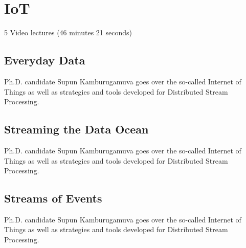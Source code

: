 


\chapter{IoT}
\label{sec:icloud-iot}

\FILENAME

  5 Video lectures (46 minutes 21 seconds)

\section{Everyday Data}

Ph.D. candidate Supun Kamburugamuva goes over the so-called Internet of
Things as well as strategies and tools developed for Distributed Stream
Processing.




\section{Streaming the Data Ocean}

Ph.D. candidate Supun Kamburugamuva goes over the so-called Internet of
Things as well as strategies and tools developed for Distributed Stream
Processing.



\section{Streams of Events}

Ph.D. candidate Supun Kamburugamuva goes over the so-called Internet of
Things as well as strategies and tools developed for Distributed Stream
Processing.


